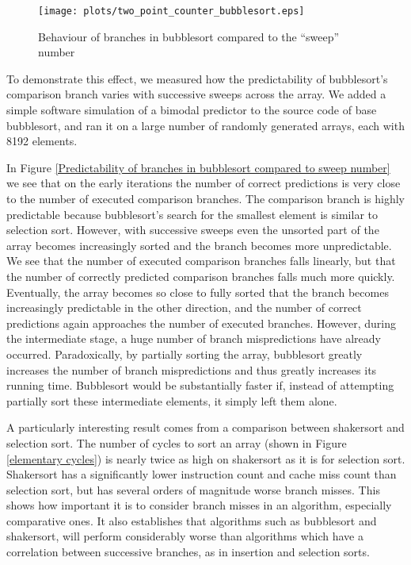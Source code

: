\begin{figure}
\texttt{[image: plots/two\_point\_counter\_bubblesort.eps]}
\caption{Behaviour of branches in bubblesort compared to the ``sweep'' number}
\label{Predictability of branches in bubblesort compared to sweep number}
\end{figure}

To demonstrate this effect, we measured how the predictability of bubblesort's
comparison branch varies with successive sweeps across the array. We added a
simple software simulation of a bimodal predictor to the source code of base
bubblesort, and ran it on a large number of randomly generated arrays, each with
8192 elements.

In Figure \ref{Predictability of branches in bubblesort compared to sweep
number} we see that on the early iterations the number of correct predictions is
very close to the number of executed comparison branches. The comparison branch
is highly predictable because bubblesort's search for the smallest element is
similar to selection sort. However, with successive sweeps even the unsorted
part of the array becomes increasingly sorted and the branch becomes more
unpredictable. We see that the number of executed comparison branches falls
linearly, but that the number of correctly predicted comparison branches falls
much more quickly. Eventually, the array becomes so close to fully sorted that
the branch becomes increasingly predictable in the other direction, and the
number of correct predictions again approaches the number of executed branches.
However, during the intermediate stage, a huge number of branch mispredictions
have already occurred. Paradoxically, by partially sorting the array, bubblesort
greatly increases the number of branch mispredictions and thus greatly increases
its running time. Bubblesort would be substantially faster if, instead of
attempting partially sort these intermediate elements, it simply left them
alone.

A particularly interesting result comes from a comparison between shakersort and
selection sort. The number of cycles to sort an array (shown in Figure
\ref{elementary cycles}) is nearly twice as high on shakersort as it is for
selection sort. Shakersort has a significantly lower instruction count and cache
miss count than selection sort, but has several orders of magnitude worse branch
misses. This shows how important it is to consider branch misses in an
algorithm, especially comparative ones. It also establishes that algorithms such
as bubblesort and shakersort, will perform considerably worse than algorithms
which have a correlation between successive branches, as in insertion and
selection sorts.

